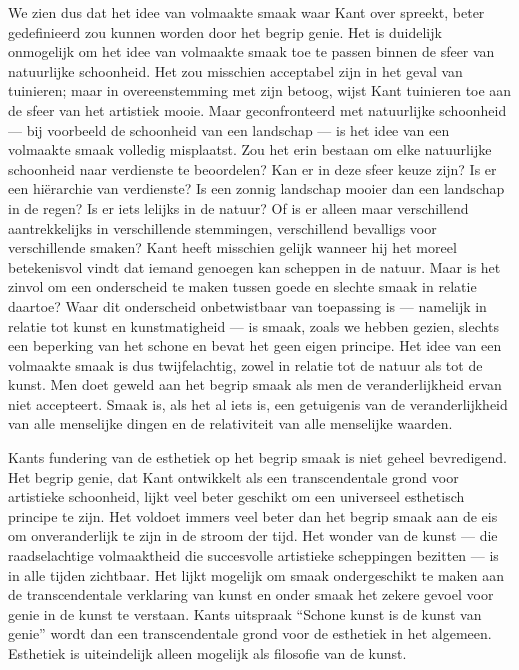We zien dus dat het idee van volmaakte smaak waar Kant over spreekt, beter gedefinieerd zou kunnen worden door het begrip genie. Het is duidelijk onmogelijk om het idee van volmaakte smaak toe te passen binnen de sfeer van natuurlijke schoonheid. Het zou misschien acceptabel zijn in het geval van tuinieren; maar in overeenstemming met zijn betoog, wijst Kant tuinieren toe aan de sfeer van het artistiek mooie. Maar geconfronteerd met natuurlijke schoonheid — bij voorbeeld de schoonheid van een landschap — is het idee van een volmaakte smaak volledig misplaatst. Zou het erin bestaan om elke natuurlijke schoonheid naar verdienste te beoordelen? Kan er in deze sfeer keuze zijn? Is er een hiërarchie van verdienste? Is een zonnig landschap mooier dan een landschap in de regen? Is er iets lelijks in de natuur? Of is er alleen maar verschillend aantrekkelijks in verschillende stemmingen, verschillend bevalligs voor verschillende smaken? Kant heeft misschien gelijk wanneer hij het moreel betekenisvol vindt dat iemand genoegen kan scheppen in de natuur. Maar is het zinvol om een onderscheid te maken tussen goede en slechte smaak in relatie daartoe? Waar dit onderscheid onbetwistbaar van toepassing is — namelijk in relatie tot kunst en kunstmatigheid — is smaak, zoals we hebben gezien, slechts een beperking van het schone en bevat het geen eigen principe. Het idee van een volmaakte smaak is dus twijfelachtig, zowel in relatie tot de natuur als tot de kunst. Men doet geweld aan het begrip smaak als men de veranderlijkheid ervan niet accepteert. Smaak is, als het al iets is, een getuigenis van de veranderlijkheid van alle menselijke dingen en de relativiteit van alle menselijke waarden.

Kants fundering van de esthetiek op het begrip smaak is niet geheel bevredigend. Het begrip genie, dat Kant ontwikkelt als een transcendentale grond voor artistieke schoonheid, lijkt veel beter geschikt om een universeel esthetisch principe te zijn. Het voldoet immers veel beter dan het begrip smaak aan de eis om onveranderlijk te zijn in de stroom der tijd. Het wonder van de kunst — die raadselachtige volmaaktheid die succesvolle artistieke scheppingen bezitten — is in alle tijden zichtbaar. Het lijkt mogelijk om smaak ondergeschikt te maken aan de transcendentale verklaring van kunst en onder smaak het zekere gevoel voor genie in de kunst te verstaan. Kants uitspraak ``Schone kunst is de kunst van genie'' wordt dan een transcendentale grond voor de esthetiek in het algemeen. Esthetiek is uiteindelijk alleen mogelijk als filosofie van de kunst.

